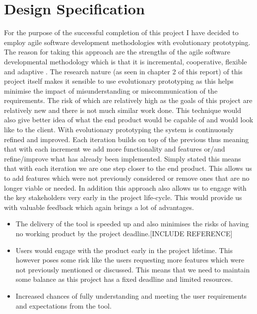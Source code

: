 \chapter{Design Specification}
For the purpose of the successful completion of this project I have decided to employ agile software development methodologies with evolutionary prototyping. The reason for taking this approach are the strengths of the agile software developmental methodology which is that it is incremental, cooperative, flexible and adaptive \cite{4147390}. The research nature (as seen in chapter 2 of this report) of this project itself makes it sensible to use evolutionary prototyping as this helps minimise the impact of misunderstanding or miscommunication of the requirements. The risk of which are relatively high as the goals of this project are relatively new and there is not much similar work done. This technique would also give better idea of what the end product would be capable of and would look like to the client. With evolutionary prototyping the system is continuously refined and improved. Each iteration builds on top of the previous thus meaning that with each increment we add more functionality and features or/and refine/improve what has already been implemented. Simply stated this means that with each iteration we are one step closer to the end product. This allows us to add features which were not previously considered or remove ones that are no longer viable or needed. In addition this approach also allows us to engage with the key stakeholders very early in the project life-cycle. This would provide us with valuable feedback which again brings a lot of advantages.

\begin{itemize}
	\item The delivery of the tool is speeded up and also minimises the risks of having no working product by the project deadline.[INCLUDE REFERENCE]
	\item Users would engage with the product early in the project lifetime. This however poses some risk like the users requesting more features which were not previously mentioned or discussed. This means that we need to maintain some balance as this project has a fixed deadline and limited resources.
	\item Increased chances of fully understanding and meeting the user requirements and expectations from the tool.
\end{itemize}

